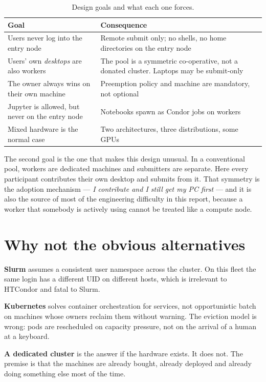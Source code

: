 \begin{table}[H]
\centering
\begin{tabularx}{\textwidth}{L{0.42\textwidth} Y}
\toprule
\textbf{Goal} & \textbf{Consequence} \\
\midrule
Users never log into the entry node & Remote submit only; no shells, no home directories on the entry node \\
Users' own \emph{desktops} are also workers & The pool is a symmetric co-operative, not a donated cluster. Laptops may be submit-only \\
The owner always wins on their own machine & Preemption policy and machine  are mandatory, not optional \\
Jupyter is allowed, but never on the entry node & Notebooks spawn as Condor jobs on workers \\
Mixed hardware is the normal case & Two architectures, three distributions, some GPUs \\
\bottomrule
\end{tabularx}
\caption{Design goals and what each one forces.}
\end{table}

The second goal is the one that makes this design unusual. In a conventional
pool, workers are dedicated machines and submitters are separate. Here every
participant contributes their own desktop and submits from it. That symmetry is
the adoption mechanism --- \emph{I contribute and I still get my PC first} ---
and it is also the source of most of the engineering difficulty in this report,
because a worker that somebody is actively using cannot be treated like a
compute node.

\section{Why not the obvious alternatives}

\textbf{Slurm} assumes a consistent user namespace across the cluster. On this
fleet the same login has a different UID on different hosts, which is irrelevant
to HTCondor and fatal to Slurm.

\textbf{Kubernetes} solves container orchestration for services, not opportunistic
batch on machines whose owners reclaim them without warning. The eviction model
is wrong: pods are rescheduled on capacity pressure, not on the arrival of a
human at a keyboard.

\textbf{A dedicated cluster} is the answer if the hardware exists. It does not.
The premise is that the machines are already bought, already deployed and already
doing something else most of the time.

